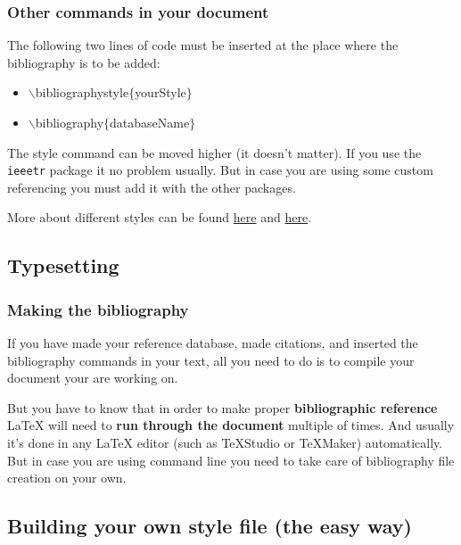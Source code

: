 \begin{frame}  \frametitle{Other commands in your document}
	The following two lines of code must be inserted at the place where the bibliography is to be added:
	\begin{itemize}
		\item[] {\color{command}$\backslash$bibliographystyle\color{braces}$\{${\color{black}yourStyle}$\}$}
		\item[] {\color{command}$\backslash$bibliography\color{braces}$\{${\color{black}databaseName}$\}$}
	\end{itemize}
	The style command can be moved higher (it doesn't matter). If you use the \texttt{\color{highlight}ieeetr} package it no problem usually. But in case you are using some custom referencing you must add it with the other packages.
	
	\vspace{0.2cm}	
	
	More about different styles can be found \href{http://www.cs.stir.ac.uk/~kjt/software/latex/showbst.html}{here} and \href{http://www.univie.ac.at/nuhag-php/bibtex/bibstyles.pdf}{here}.
	
\end{frame}

\subsection{Typesetting}

\begin{frame}  \frametitle{Making the bibliography}
	
	If you have made your reference database, made citations, and inserted the bibliography commands in your text, all you need to do is to compile your document your are working on. 
	
	\vspace{0.5cm}
	
	But you have to know that in order to make proper \textbf{bibliographic reference} LaTeX will need to \textbf{run through the document} multiple of times. And usually it's done in any LaTeX editor  (such as TeXStudio or TeXMaker) automatically. But in case you are using command line you need to take care of bibliography file creation on your own.
	
\end{frame}

\subsection{Building your own style file (the easy way)}

